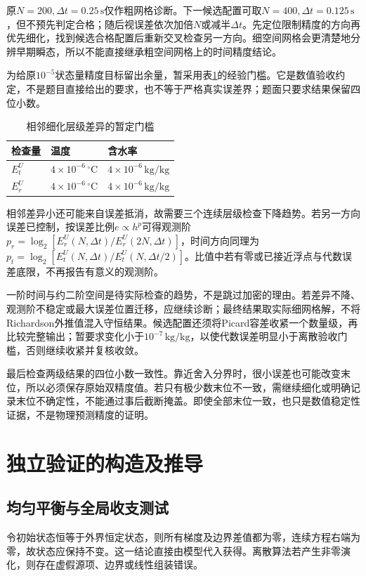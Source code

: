 \documentclass[UTF8,a4paper,zihao=-4,fontset=none]{ctexart}
\numberwithin{equation}{section}
\newcommand{\units}[1]{\,\mathrm{#1}}
\begin{document}
原$N=200,\Delta t=0.25\units s$仅作粗网格诊断。下一候选配置可取$N=400,\Delta t=0.125\units s$，但不预先判定合格；随后视误差依次加倍$N$或减半$\Delta t$。先定位限制精度的方向再优先细化，找到候选合格配置后重新交叉检查另一方向。细空间网格会更清楚地分辨早期瞬态，所以不能直接继承粗空间网格上的时间精度结论。

为给原$10^{-5}$状态量精度目标留出余量，暂采用表\ref{tab:tolerance}的经验门槛。它是数值验收约定，不是题目直接给出的要求，也不等于严格真实误差界；题面只要求结果保留四位小数。

\begin{table}[htbp]
\centering
\caption{相邻细化层级差异的暂定门槛}\label{tab:tolerance}
\begin{tabular}{@{}lll@{}}
\toprule
检查量 & 温度 & 含水率\\
\midrule
$E_t^U$ & $4\times10^{-6}\,^\circ\mathrm C$ & $4\times10^{-6}\units{kg/kg}$\\
$E_r^U$ & $4\times10^{-6}\,^\circ\mathrm C$ & $4\times10^{-6}\units{kg/kg}$\\
\bottomrule
\end{tabular}
\end{table}

相邻差异小还可能来自误差抵消，故需要三个连续层级检查下降趋势。若另一方向误差已控制，按误差比例$e\propto h^p$可得观测阶$p_r=\log_2[E_r^U(N,\Delta t)/E_r^U(2N,\Delta t)]$，时间方向同理为$p_t=\log_2[E_t^U(N,\Delta t)/E_t^U(N,\Delta t/2)]$。比值中若有零或已接近浮点与代数误差底限，不再报告有意义的观测阶。

一阶时间与约二阶空间是待实际检查的趋势，不是跳过加密的理由。若差异不降、观测阶不稳定或最大误差位置迁移，应继续诊断；最终结果取实际细网格解，不将Richardson外推值混入守恒结果。候选配置还须将Picard容差收紧一个数量级，再比较完整输出；暂要求变化小于$10^{-7}\units{kg/kg}$，以使代数误差明显小于离散验收门槛，否则继续收紧并复核收敛。

最后检查两级结果的四位小数一致性。靠近舍入分界时，很小误差也可能改变末位，所以必须保存原始双精度值。若只有极少数末位不一致，需继续细化或明确记录末位不确定性，不能通过事后截断掩盖。即使全部末位一致，也只是数值稳定性证据，不是物理预测精度的证明。

\section{独立验证的构造及推导}
\subsection{均匀平衡与全局收支测试}
令初始状态恒等于外界恒定状态，则所有梯度及边界差值都为零，连续方程右端为零，故状态应保持不变。这一结论直接由模型代入获得。离散算法若产生非零演化，则存在虚假源项、边界或线性组装错误。
\end{document}
